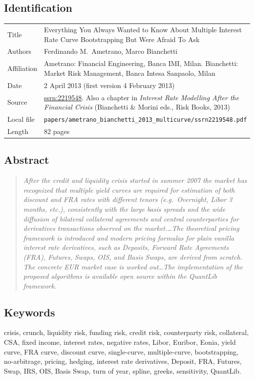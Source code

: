 \documentclass[11pt,a4paper]{article}
\begin{document}
\subsection*{Identification}
\begin{tabular}{@{}p{3.5cm}p{11cm}@{}}
\toprule
Title           & Everything You Always Wanted to Know About Multiple Interest Rate Curve Bootstrapping But Were Afraid To Ask \\
Authors         & Ferdinando M.\ Ametrano, Marco Bianchetti \\
Affiliation     & Ametrano: Financial Engineering, Banca IMI, Milan. Bianchetti: Market Risk Management, Banca Intesa Sanpaolo, Milan \\
Date            & 2 April 2013 (first version 4 February 2013) \\
Source          & \href{https://ssrn.com/abstract=2219548}{ssrn:2219548}.
                  Also a chapter in \emph{Interest Rate Modelling After the Financial Crisis} (Bianchetti \& Morini eds., Risk Books, 2013) \\
Local file      & \texttt{papers/ametrano\_bianchetti\_2013\_multicurve/ssrn2219548.pdf} \\
Length          & 82 pages \\
\bottomrule
\end{tabular}

\subsection*{Abstract}
\begin{quote}\itshape
After the credit and liquidity crisis started in summer 2007 the
market has recognized that multiple yield curves are required for
estimation of both discount and FRA rates with different tenors
(e.g.\ Overnight, Libor 3 months, etc.), consistently with the large
basis spreads and the wide diffusion of bilateral collateral
agreements and central counterparties for derivatives transactions
observed on the market.\dots The theoretical pricing framework is
introduced and modern pricing formulas for plain vanilla interest rate
derivatives, such as Deposits, Forward Rate Agreements (FRA),
Futures, Swaps, OIS, and Basis Swaps, are derived from scratch. The
concrete EUR market case is worked out\dots The implementation of
the proposed algorithms is available open source within the QuantLib
framework.
\end{quote}

\subsection*{Keywords}
crisis, crunch, liquidity risk, funding risk, credit risk, counterparty risk,
collateral, CSA, fixed income, interest rates, negative rates, Libor,
Euribor, Eonia, yield curve, FRA curve, discount curve, single-curve,
multiple-curve, bootstrapping, no-arbitrage, pricing, hedging,
interest rate derivatives, Deposit, FRA, Futures, Swap, IRS, OIS,
Basis Swap, turn of year, spline, greeks, sensitivity, QuantLib.
\end{document}
